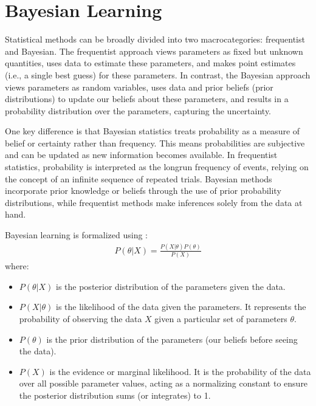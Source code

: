 \documentclass[letterpaper,10pt,english]{jupyterBook}
\begin{document}
\section{Bayesian Learning}
\label{\detokenize{notebooks/review_stats:bayesian-learning}}
\sphinxAtStartPar
Statistical methods can be broadly divided into two macro\sphinxhyphen{}categories: frequentist and Bayesian. The frequentist approach views parameters as fixed but unknown quantities, uses data to estimate these parameters, and makes point estimates (i.e., a single best guess) for these parameters. In contrast, the Bayesian approach views parameters as random variables, uses data and prior beliefs (prior distributions) to update our beliefs about these parameters, and results in a probability distribution over the parameters, capturing the uncertainty.

\sphinxAtStartPar
One key difference is that Bayesian statistics treats probability as a measure of belief or certainty rather than frequency. This means probabilities are subjective and can be updated as new information becomes available. In frequentist statistics, probability is interpreted as the long\sphinxhyphen{}run frequency of events, relying on the concept of an infinite sequence of repeated trials. Bayesian methods incorporate prior knowledge or beliefs through the use of prior probability distributions, while frequentist methods make inferences solely from the data at hand.

\sphinxAtStartPar
Bayesian learning is formalized using :
\begin{equation*}
\begin{split}
P(\theta | X) = \frac{P(X | \theta)P(\theta)}{P(X)}
\end{split}
\end{equation*}
\sphinxAtStartPar
where:
\begin{itemize}
\item {} 
\sphinxAtStartPar
\(P(\theta | X)\) is the posterior distribution of the parameters given the data.

\item {} 
\sphinxAtStartPar
\(P(X | \theta)\) is the likelihood of the data given the parameters. It represents the probability of observing the data \(X\) given a particular set of parameters \(\theta\).

\item {} 
\sphinxAtStartPar
\(P(\theta)\) is the prior distribution of the parameters (our beliefs before seeing the data).

\item {} 
\sphinxAtStartPar
\(P(X)\) is the evidence or marginal likelihood. It is the probability of the data over all possible parameter values, acting as a normalizing constant to ensure the posterior distribution sums (or integrates) to 1.

\end{itemize}
\end{document}
